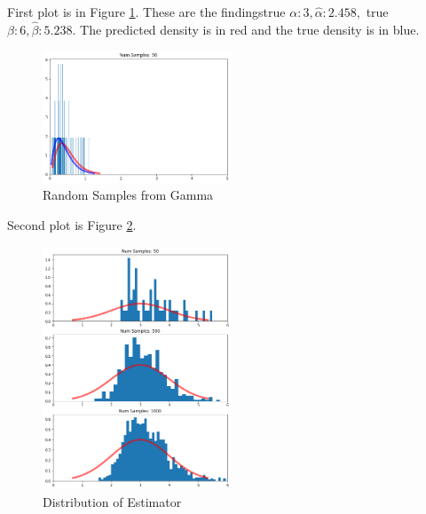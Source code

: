 First plot is in Figure \ref{gamma_est}.
These are the findingstrue $\alpha: 3, \hat{\alpha}: 2.458,$ true $\beta: 6, \hat{\beta}: 5.238$.
The predicted density is in red and the true density is in blue.

\begin{figure}[ht]
\caption{Random Samples from Gamma}
\label{gamma_est}
\centering
\includegraphics[width=0.5\textwidth]{figs/q5_plot1.png}
\end{figure}
Second plot is Figure \ref{sample_dist}.
\begin{figure}[ht]
\caption{Distribution of Estimator}
\label{sample_dist}
\centering
\includegraphics[width=0.5\textwidth]{figs/q5_plot2.png}
\end{figure}
